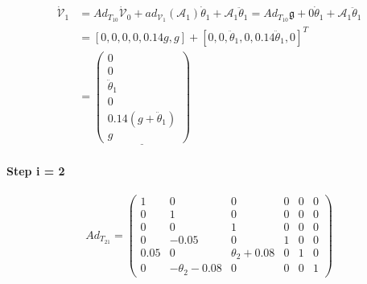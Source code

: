 \documentclass[]{scrreprt}
\newcommand{\myvec}[1]{\left(\begin{array}{c}#1\end{array}\right)}
\begin{document}
\begin{align*}
\dot{\mathcal{V}}_1 &= Ad_{T_{10}}\dot{\mathcal{V}}_0 + ad_{\mathcal{V}_1}(\mathcal{A}_1)\dot{\theta}_1+\mathcal{A}_1\ddot{\theta}_1
= Ad_{T_{10}}\mathfrak{g} + 0\dot{\theta}_1+\mathcal{A}_1\ddot{\theta}_1\\
&= [0,0,0,0,0.14g,g]+[0,0,\ddot{\theta}_1,0,0.14\ddot{\theta}_1,0]^T\\
&= \underline{\myvec{0\\0\\\ddot{\theta}_1\\0\\0.14(g+\ddot{\theta}_1)\\ g}}
\end{align*}    

\paragraph{Step i = 2}


\[
Ad_{T_{21}} = \left(\begin{array}{cccccc}
1 & 0 & 0 & 0 & 0 & 0 \\
0 & 1 & 0 & 0 & 0 & 0 \\
0 & 0 & 1 & 0 & 0 & 0 \\
0 & -0.05 & 0 & 1 & 0 & 0 \\
0.05 & 0 & \theta_2+0.08 & 0 & 1 & 0 \\
0 & -\theta_2-0.08 & 0 & 0 & 0 & 1
\end{array}\right)
\]
\end{document}
